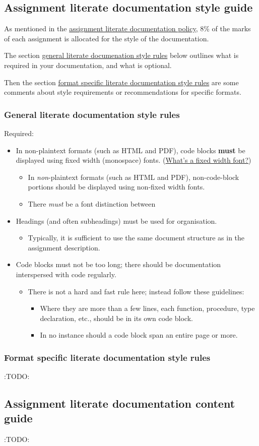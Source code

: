 \documentclass[11pt]{article}
\begin{document}
\subsection{Assignment literate documentation style guide}
\label{sec:org7d37673}
As mentioned in the
\hyperref[sec:org9ca13e1]{assignment literate documentation policy},
8\% of the marks of each assignment
is allocated for the style of the documentation.

The section
\hyperref[sec:org08f20a6]{general literate documenation style rules}
below outlines what is required in your documentation,
and what is optional.

Then the section
\hyperref[sec:orgbbd1578]{format specific literate documentation style rules}
 are some comments about style requirements or
recommendations for specific formats.

\subsubsection{General literate documentation style rules}
\label{sec:org08f20a6}
Required:
\begin{itemize}
\item In non-plaintext formats (such as HTML and PDF),
code blocks \textbf{must} be displayed using fixed width
(monospace) fonts.
(\href{https://en.wikipedia.org/wiki/Monospaced\_font}{What's a fixed width font?})
\begin{itemize}
\item In \emph{non}-plaintext formats (such as HTML and PDF),
non-code-block portions should be displayed using
non-fixed width fonts.
\item There \emph{must} be a font distinction between
\end{itemize}
\item Headings (and often subheadings) must be used for organisation.
\begin{itemize}
\item Typically, it is sufficient to use the same document structure
as in the assignment description.
\end{itemize}
\item Code blocks must not be too long; there should be documentation
interspersed with code regularly.
\begin{itemize}
\item There is not a hard and fast rule here;
instead follow these guidelines:
\begin{itemize}
\item Where they are more than a few lines, each function, procedure,
type declaration, etc., should be in its own code block.
\item In no instance should a code block span an entire page or more.
\end{itemize}
\end{itemize}
\end{itemize}

\subsubsection{Format specific literate documentation style rules}
\label{sec:orgbbd1578}
:TODO:

\subsection{Assignment literate documentation content guide}
\label{sec:org53fa978}
:TODO:
\end{document}

